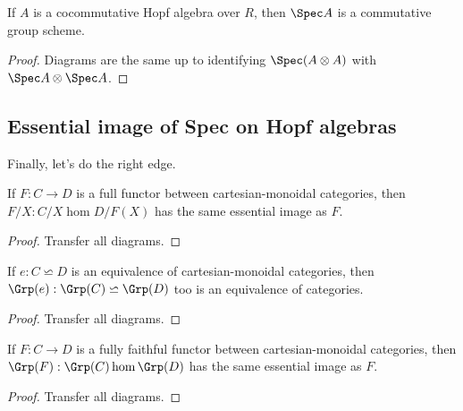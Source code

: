 \begin{proposition}
  \label{0-spec-cocomm-hopf}
  \leanok

  If $A$ is a cocommutative Hopf algebra over $R$, then $\Spec A$ is a commutative group scheme.
\end{proposition}
\begin{proof}
  \uses{}
  \leanok

  Diagrams are the same up to identifying $\Spec (A \otimes A)$ with $\Spec A \otimes \Spec A$.
\end{proof}


\subsection{Essential image of Spec on Hopf algebras}


Finally, let's do the right edge.


\begin{proposition}
  \label{0-ess-image-over}
  \uses{}
  \leanok

  If $F : C \to D$ is a full functor between cartesian-monoidal categories, then $F / X : C / X \hom D / F(X)$ has the same essential image as $F$.
\end{proposition}
\begin{proof}
  \uses{}
  \leanok

  Transfer all diagrams.
\end{proof}


\begin{proposition}
  \label{0-grp-equiv}
  \uses{}
  \leanok

  If $e : C \backsimeq D$ is an equivalence of cartesian-monoidal categories, then $\Grp(e) : \Grp(C) \backsimeq \Grp(D)$ too is an equivalence of categories.
\end{proposition}
\begin{proof}
  \uses{}
  \leanok

  Transfer all diagrams.
\end{proof}


\begin{proposition}
  \label{0-ess-image-grp}
  \uses{}
  \leanok

  If $F : C \to D$ is a fully faithful functor between cartesian-monoidal categories, then $\Grp(F) : \Grp(C) \hom \Grp(D)$ has the same essential image as $F$.
\end{proposition}
\begin{proof}

  Transfer all diagrams.
\end{proof}


